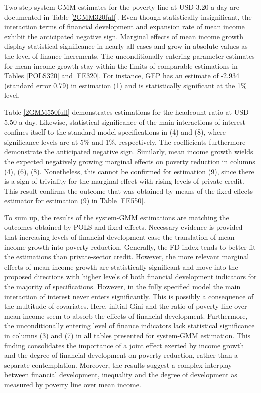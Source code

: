 \documentclass[12pt, a4paper]{article}
\begin{document}
Two-step system-GMM estimates for the poverty line at USD 3.20 a day are documented in Table \ref{2GMM320full}. Even though statistically insignificant, the interaction terms of financial development and expansion rate of mean income exhibit the anticipated negative sign. Marginal effects of mean income growth display statistical significance in nearly all cases and grow in absolute values as the level of finance increments. The unconditionally entering parameter estimates for mean income growth stay within the limits of comparable estimations in Tables \ref{POLS320} and \ref{FE320}. For instance, GEP has an estimate of -2.934 (standard error 0.79) in estimation (1) and is statistically significant at the 1\% level.

Table \ref{2GMM550full} demonstrates estimations for the headcount ratio at USD 5.50 a day. Likewise, statistical significance of the main interactions of interest confines itself to the standard model specifications in (4) and (8), where significance levels are at 5\% and 1\%, respectively. The coefficients furthermore demonstrate the anticipated negative sign. Similarly, mean income growth wields the expected negatively growing marginal effects on poverty reduction in columns (4), (6), (8). Nonetheless, this cannot be confirmed for estimation (9), since there is a sign of triviality for the marginal effect with rising levels of private credit. This result confirms the outcome that was obtained by means of the fixed effects estimator for estimation (9) in Table \ref{FE550}.

To sum up, the results of the system-GMM estimations are matching the outcomes obtained by POLS and fixed effects. Necessary evidence is provided that increasing levels of financial development ease the translation of mean income growth into poverty reduction. Generally, the FD index tends to better fit the estimations than private-sector credit. However, the more relevant marginal effects of mean income growth are statistically significant and move into the proposed directions with higher levels of both financial development indicators for the majority of specifications. However, in the fully specified model the main interaction of interest never enters significantly. This is possibly a consequence of the multitude of covariates. Here, initial Gini and the ratio of poverty line over mean income seem to absorb the effects of financial development. Furthermore, the unconditionally entering level of finance indicators lack statistical significance in columns (3) and (7) in all tables presented for system-GMM estimation. This finding consolidates the importance of a joint effect exerted by income growth and the degree of financial development on poverty reduction, rather than a separate contemplation. Moreover, the results suggest a complex interplay between financial development, inequality and the degree of development as measured by poverty line over mean income.
\end{document}
